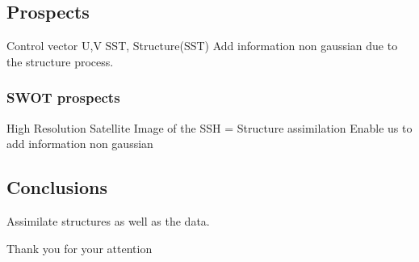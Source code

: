 \documentclass[compress,slidescentered,notes=show]{beamer}
\begin{document}
	\subsection{Prospects}
\begin{frame}
Control vector U,V SST, Structure(SST)
Add information non gaussian due to the structure process. 
\end{frame}
\begin{frame}
\frametitle{SWOT prospects}
High Resolution Satellite 
Image of the SSH = Structure assimilation
Enable us to add information non gaussian
\end{frame}

	\subsection{Conclusions}
\begin{frame}
Assimilate structures as well as the data. 
\end{frame}

\begin{frame}
\begin{center}
Thank you for your attention 
\end{center}
\end{frame}
\end{document}
